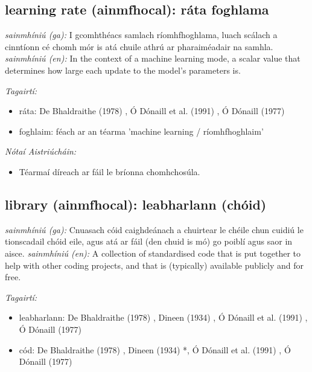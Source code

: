 \documentclass{article}
\begin{document}
\subsection*{learning rate (ainmfhocal): ráta foghlama} 
 \noindent \textit{sainmhíniú (ga):} I gcomhthéacs samlach ríomhfhoghlama, luach scálach a cinntíonn cé chomh mór is atá chuile athrú ar pharaiméadair na samhla.
\newline\newline
 \noindent \textit{sainmhíniú (en):} In the context of a machine learning mode, a scalar value that determines how large each update to the model's parameters is.
\newline

 \noindent \textit{Tagairtí:}
\begin{itemize}
	\item ráta: De Bhaldraithe (1978) \cite{de-bhaldraithe}, Ó Dónaill et al. (1991) \cite{focloir-beag}, Ó Dónaill (1977) \cite{odonaill}
	\item foghlaim: féach ar an téarma 'machine learning / ríomhfhoghlaim'
\end{itemize}

 \noindent \textit{Nótaí Aistriúcháin:}
\begin{itemize}
	\item Téarmaí díreach ar fáil le bríonna chomhchosúla.
\end{itemize}


\subsection*{library (ainmfhocal): leabharlann (chóid)} 
 \noindent \textit{sainmhíniú (ga):} Cnuasach cóid caighdeánach a chuirtear le chéile chun cuidiú le tionscadail chóid eile, agus atá ar fáil (den chuid is mó) go poiblí agus saor in aisce.
\newline\newline
 \noindent \textit{sainmhíniú (en):} A collection of standardised code that is put together to help with other coding projects, and that is (typically) available publicly and for free.
\newline

 \noindent \textit{Tagairtí:}
\begin{itemize}
	\item leabharlann: De Bhaldraithe (1978) \cite{de-bhaldraithe}, Dineen (1934) \cite{dineen}, Ó Dónaill et al. (1991) \cite{focloir-beag}, Ó Dónaill (1977) \cite{odonaill}
	\item cód: De Bhaldraithe (1978) \cite{de-bhaldraithe}, Dineen (1934) \cite{dineen}*, Ó Dónaill et al. (1991) \cite{focloir-beag}, Ó Dónaill (1977) \cite{odonaill}
\end{itemize}
\end{document}
